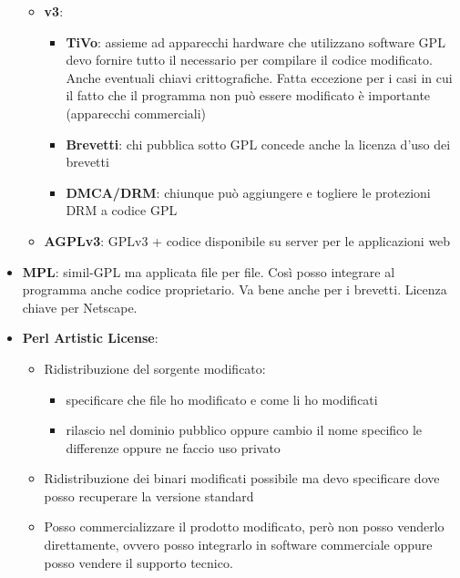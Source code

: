 \begin{itemize}
\begin{itemize}
			\item \textbf{v3}:
				\begin{itemize}
					\item \textbf{TiVo}: assieme ad apparecchi hardware che utilizzano software GPL devo fornire tutto il necessario per compilare il codice modificato. Anche eventuali chiavi crittografiche. Fatta eccezione per i casi in cui il fatto che il programma non può essere modificato è importante (apparecchi commerciali)
					\item \textbf{Brevetti}: chi pubblica sotto GPL concede anche la licenza d’uso dei brevetti
					\item \textbf{DMCA/DRM}: chiunque può aggiungere e togliere le protezioni DRM a codice GPL
				\end{itemize}
			\item \textbf{AGPLv3}: GPLv3 + codice disponibile su server per le applicazioni web
		\end{itemize}
	\item \textbf{MPL}: simil-GPL ma applicata file per file. Così posso integrare al programma anche codice proprietario. Va bene anche per i brevetti. Licenza chiave per Netscape.
	\item \textbf{Perl Artistic License}:
		\begin{itemize}
			\item Ridistribuzione del sorgente modificato:
				\begin{itemize}
					\item specificare che file ho modificato e come li ho modificati
					\item rilascio nel dominio pubblico oppure cambio il nome specifico le differenze oppure ne faccio uso privato
				\end{itemize}
			\item Ridistribuzione dei binari modificati possibile ma devo specificare dove posso recuperare la versione standard
			\item Posso commercializzare il prodotto modificato, però non posso venderlo direttamente, ovvero posso integrarlo in software commerciale oppure posso vendere il supporto tecnico.
		\end{itemize}
\end{itemize}

